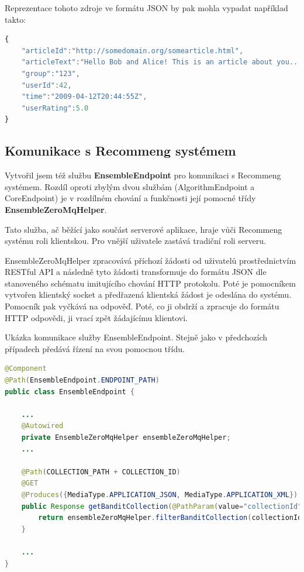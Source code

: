 \documentclass[thesis=M,czech]{FITthesis}[2014/05/07]
\begin{document}
Reprezentace tohoto zdroje ve formátu JSON by pak mohla vypadat například takto:

\begin{lstlisting}[language=JavaScript]
{
    "articleId":"http://somedomain.org/somearticle.html",
    "articleText":"Hello Bob and Alice! This is an article about you...",
    "group":"123",
    "userId":42,
    "time":"2009-04-12T20:44:55Z",
    "userRating":5.0
}
\end{lstlisting}

\subsection{Komunikace s Recommeng systémem}
\label{sec:restrec}
Vytvořil jsem též službu \textbf{EnsembleEndpoint} pro komunikaci s Recommeng systémem. Rozdíl oproti zbylým dvou službám (AlgorithmEndpoint a CoreEndpoint) je v rozdílném chování a funkčnosti její pomocné třídy \textbf{EnsembleZeroMqHelper}.

Tato služba, ač běžící jako součást serverové aplikace, hraje vůči Recommeng systému roli klientskou. Pro vnější uživatele zastává tradiční roli serveru.

EnsembleZeroMqHelper zpracovává příchozí žádosti od uživatelů prostřednictvím RESTful API a následně tyto žádosti transformuje do formátu JSON dle stanoveného schématu imitujícího chování HTTP protokolu. Poté je pomocníkem vytvořen klientský socket a předřazená klientská žádost je odeslána do systému. Pomocník pak vyčkává na odpověď. Poté, co ji obdrží a zpracuje do formátu HTTP odpovědi, ji vrací zpět žádajícímu klientovi. 

Ukázka komunikace služby EnsembleEndpoint. Stejně jako v předchozích případech předává řízení na svou pomocnou třídu.

\begin{lstlisting}[language=java]
@Component
@Path(EnsembleEndpoint.ENDPOINT_PATH)
public class EnsembleEndpoint {
    
    ...
    @Autowired
    private EnsembleZeroMqHelper ensembleZeroMqHelper;
    ...
	
    @Path(COLLECTION_PATH + COLLECTION_ID)
    @GET   
    @Produces({MediaType.APPLICATION_JSON, MediaType.APPLICATION_XML})
    public Response getBanditCollection(@PathParam(value="collectionId") String collectionId, @QueryParam(value = "filter") String filter) {
        return ensembleZeroMqHelper.filterBanditCollection(collectionId, filter);
    }
    
    ...
}
\end{lstlisting}
\end{document}
